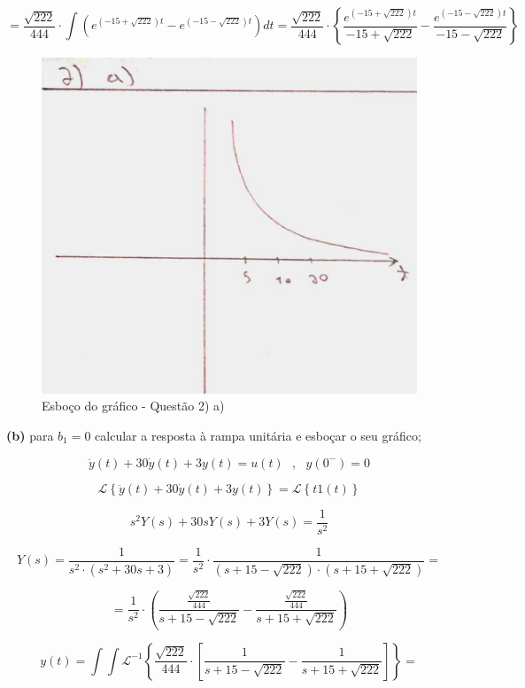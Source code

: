 \documentclass{article}
\begin{document}
\[ = \frac{\sqrt{222}}{444} \cdot \int (e^{(-15+\sqrt{222})t} - e^{(-15-\sqrt{222})t}) dt = \frac{\sqrt{222}}{444} \cdot \left\{ \frac{e^{(-15+\sqrt{222})t}}{-15+\sqrt{222}} - \frac{e^{(-15-\sqrt{222})t}}{-15-\sqrt{222}} \right\}  \]

\begin{figure}[h]
    \includegraphics[scale=0.25]{Q2_a.png}
    \centering
    \caption{Esboço do gráfico - Questão 2) a)}
\end{figure}

\textbf{(b)} para $b_1 = 0$ calcular a resposta à rampa unitária e esboçar o seu gráfico;

\[\ddot{y}(t) + 30\dot{y}(t) + 3y(t) = u(t)\,\,\,\,,\,\,\,\,y(0^{-}) = 0\]

\[\mathcal{L} \left\{\ddot{y}(t) + 30\dot{y}(t) + 3y(t)\right\} = \mathcal{L} \left\{t1(t)\right\}\]

\[ s^{2}Y(s) + 30sY(s) + 3Y(s) = \frac{1}{s^{2}} \]

\[ Y(s) = \frac{1}{s^{2} \cdot (s^{2} + 30s + 3)} = \frac{1}{s^{2}} \cdot \frac{1}{(s + 15 - \sqrt{222}) \cdot (s + 15 + \sqrt{222})} =\]

\[ = \frac{1}{s^{2}} \cdot \left(\frac{ \frac{\sqrt{222}}{444}}{s + 15 - \sqrt{222}} - \frac{\frac{\sqrt{222}}{444}}{s + 15 + \sqrt{222}}\right) \]

\[ y(t) = \int \int \mathcal{L}^{-1} \left\{\frac{\sqrt{222}}{444} \cdot \left[ \frac{1}{s + 15 - \sqrt{222}} - \frac{1}{s + 15 + \sqrt{222}} \right] \right\} = \]
\end{document}
